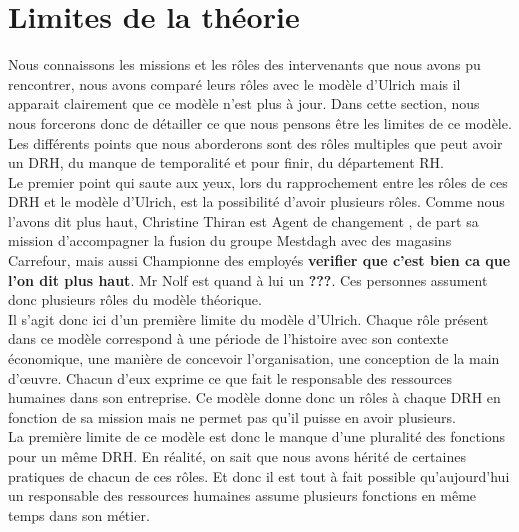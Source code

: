 \section{Limites de la théorie}

Nous connaissons les missions et les rôles des intervenants que nous avons pu rencontrer, nous avons comparé leurs rôles avec le modèle d'Ulrich mais il apparait clairement que ce modèle n'est plus à jour. Dans cette section, nous nous forcerons donc de détailler ce que nous pensons être les limites de ce modèle. Les différents points que nous aborderons sont des rôles multiples que peut avoir un DRH, du manque de temporalité et pour finir, du département RH. \\



Le premier point qui saute aux yeux, lors du rapprochement entre les rôles de ces DRH et le modèle d'Ulrich, est la possibilité d'avoir plusieurs rôles. Comme nous l'avons dit plus haut, Christine Thiran est \og Agent de changement \fg{}, de part sa mission d'accompagner la fusion du groupe Mestdagh avec des magasins Carrefour, mais aussi \og Championne des employés \fg{} \textbf{verifier que c'est bien ca que l'on dit plus haut}. Mr Nolf est quand à lui un \textbf{???}. Ces personnes assument donc plusieurs rôles du modèle théorique. \\

Il s'agit donc ici d'un première limite du modèle d'Ulrich. Chaque rôle présent dans ce modèle correspond à une période de l'histoire avec son contexte économique, une manière de concevoir l'organisation, une conception de la main d'œuvre. Chacun d'eux exprime ce que fait le responsable des ressources humaines dans son entreprise. Ce modèle donne donc un rôles à chaque DRH en fonction de sa mission %
  mais ne permet pas qu'il puisse en avoir plusieurs.\\ 

La première limite de ce modèle est donc le manque d'une pluralité des fonctions pour un même DRH. En réalité, on sait que nous avons hérité de certaines pratiques de chacun de ces rôles. Et donc il est tout à fait possible qu'aujourd'hui un responsable des ressources humaines assume plusieurs fonctions en même temps dans son métier. \\


